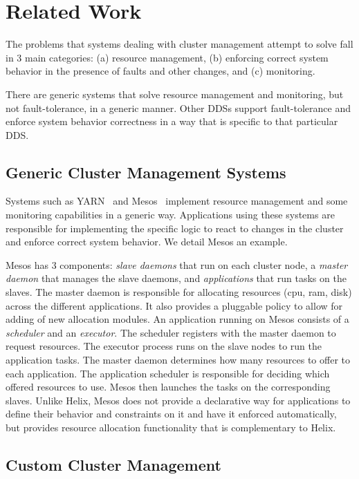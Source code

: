 \section{Related Work}
\label{sec:related}
%
The problems that systems dealing with cluster management attempt to solve fall in 3 main categories:
(a) resource management, (b) enforcing correct system behavior in the presence
of faults and other changes, and (c) monitoring. 

There are generic systems that solve resource management and monitoring, but not
fault-tolerance, in a generic manner.  Other DDSs support fault-tolerance and
enforce system behavior correctness in a way that is specific to that particular
DDS.

\subsection{Generic Cluster Management Systems}

Systems such as YARN~\cite{yarn} and Mesos~\cite{mesos} implement resource management and 
some monitoring capabilities in a generic way. Applications using these systems are responsible 
for implementing the specific logic to react to changes in the cluster and enforce correct system behavior. 
We detail Mesos an example.

Mesos has 3 components: \emph{slave daemons} that run on each cluster node, a
\emph{master daemon} that manages the slave daemons, and \emph{applications} that 
run tasks on the slaves.
The master daemon is responsible for allocating resources (cpu, ram, disk) across
the different applications. It also provides a pluggable policy to allow for
adding of new allocation modules.
An application running on Mesos consists of a \emph{scheduler} and an
\emph{executor}.  The scheduler registers with the master daemon to request
resources. The executor process
runs on the slave nodes to run the application tasks. The master daemon determines how many
resources to offer to each application. The application scheduler is responsible
for deciding which offered resources to use.  Mesos then launches the tasks on
the corresponding slaves.
Unlike Helix, Mesos does not provide a declarative way for applications to
define their behavior and constraints on it and have it enforced automatically,
but provides resource allocation functionality that is complementary to Helix.

\subsection{Custom Cluster Management}

